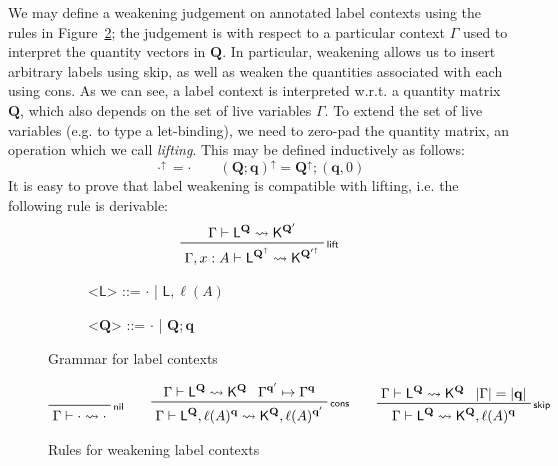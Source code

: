 \documentclass[acmsmall,screen,review]{acmart}
\newcommand{\mb}[1]{\ensuremath{\mathbf{#1}}}
\newcommand{\ms}[1]{\ensuremath{\mathsf{#1}}}
\newcommand{\cwk}[2]{#1 \mapsto #2}
\newcommand{\lwk}[3]{#1 \vdash #2 \rightsquigarrow #3}
\newcommand{\lhyp}[2]{#1(#2)}
\newcommand{\rle}[1]{{\scriptsize\textsf{#1}}}
\newcommand{\brle}[1]{{\textsf{#1}}}
\newcommand{\zeroqv}[1]{#1^\uparrow}
\begin{document}
We may define a weakening judgement on annotated label contexts using the rules in 
Figure~\ref{fig:label-wk}; the judgement is with respect to a particular context $\Gamma$ used to 
interpret the quantity vectors in $\mb{Q}$. In particular, weakening allows us to  insert arbitrary 
labels using \brle{skip}, as well as weaken the quantities associated with each
using \brle{cons}.
As we can see, a label context is interpreted w.r.t. a quantity matrix $\mb{Q}$, which also depends
on the set of live variables $\Gamma$. To extend the set of live variables 
(e.g. to type a let-binding), we need to zero-pad the quantity matrix, an operation which we call 
\emph{lifting}. This may be defined inductively as follows:
\begin{equation*}
  \zeroqv{\cdot} = \cdot \qquad
  \zeroqv{(\mb{Q}; \mb{q})} = \zeroqv{\mb{Q}} ; (\mb{q}, 0)
\end{equation*} 
It is easy to prove that label weakening is compatible with lifting, i.e. the following rule is 
derivable:
\begin{equation*}
  \prftree[r]{\rle{lift}}
    {\lwk{\Gamma}{\ms{L}^{\mb{Q}}}{\ms{K}^{\mb{Q}'}}}
    {\lwk{\Gamma, x : A}{\ms{L}^{\zeroqv{\mb{Q}}}}{\ms{K}^{\zeroqv{\mb{Q}'}}}}
\end{equation*}

\begin{figure}
  \hspace{4em}
  \begin{subfigure}[t]{.25\textwidth}
  \begin{grammar}
    <\(\ms{L}\)> ::= \(\cdot\) \;|\; \(\ms{L}, \lhyp{\ell}{A}\)
  \end{grammar}
  \end{subfigure}%
  \begin{subfigure}[t]{.25\textwidth}
  \begin{grammar}
    <\(\mb{Q}\)> ::= \(\cdot\) \;|\; \(\mb{Q}; \mb{q}\)
  \end{grammar}
  \end{subfigure}%
  \caption{Grammar for label contexts}
  \Description{}
  \label{fig:label-grammar}
\end{figure}

\begin{figure}
\begin{gather*}
  \prftree[r]{\rle{nil}}{\lwk{\Gamma}{\cdot}{\cdot}} \qquad 
  \prftree[r]{\rle{cons}}
    {\lwk{\Gamma}{\ms{L}^{\mb{Q}}}{\ms{K}^{\mb{Q}}}}
    {\cwk{\Gamma^{\mb{q}'}}{\Gamma^{\mb{q}}}}
    {\lwk{\Gamma}{\ms{L}^{\mb{Q}}, \lhyp{\ell}{A}^{\mb{q}}}
    {\ms{K}^{\mb{Q}}, \lhyp{\ell}{A}^{\mb{q}'}}} \qquad
  \prftree[r]{\rle{skip}}
    {\lwk{\Gamma}{\ms{L}^{\mb{Q}}}{\ms{K}^{\mb{Q}}}}
    {|\Gamma| = |\mb{q}|}
    {\lwk{\Gamma}{\ms{L}^{\mb{Q}}}{\ms{K}^{\mb{Q}}, \lhyp{\ell}{A}^{\mb{q}}}}
\end{gather*}
\caption{Rules for weakening label contexts}
\Description{}
\label{fig:label-wk}
\end{figure}
\end{document}

